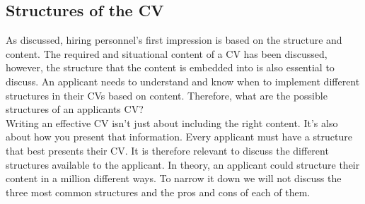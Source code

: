 \subsection{Structures of the CV}
As discussed, hiring personnel's first impression is based on the structure and content.
The required and situational content of a CV has been discussed, however, the structure that the content is embedded into is also essential to discuss.
An applicant needs to understand and know when to implement different structures in their CVs based on content.
Therefore, what are the possible structures of an applicants CV? \\

Writing an effective CV isn't just about including the right content. 
It's also about how you present that information.
Every applicant must have a structure that best presents their CV.
It is therefore relevant to discuss the different structures available to the applicant. 
In theory, an applicant could structure their content in a million different ways.
To narrow it down we will not discuss the three most common structures and the pros and cons of each of them.

